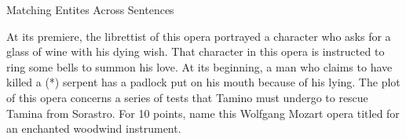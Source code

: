 \documentclass[xcolor=dvipsnames]{beamer}
\begin{document}
\begin{frame}{Matching Entites Across Sentences}

\begin{block}{}

    At its premiere, \alert<3>{the librettist of this opera} portrayed
    \alert<4>{a character who asks for a glass of wine with his dying wish}. \alert<4>{That
    character} in this opera is instructed to ring some bells to summon
    his love. At its beginning, \alert<5>{a man} who claims to have killed a (*)
    serpent has a padlock put on \alert<5>{his} mouth because of \alert<5>{his} lying. The
    plot of this opera concerns a series of tests that \alert<5>{Tamino} must
    undergo to rescue Tamina from Sorastro. For 10 points, name this
    Wolfgang Mozart opera titled for \alert<6>{an enchanted woodwind instrument}.
\end{block}



\end{frame}
\end{document}

